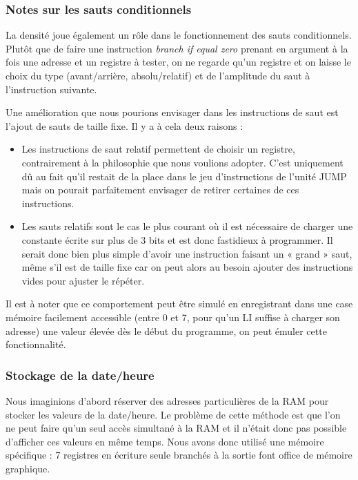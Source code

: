 \documentclass{article}
\begin{document}
\subsubsection{Notes sur les sauts conditionnels}
La densité joue également un rôle dans le fonctionnement des sauts conditionnels.
Plutôt que de faire une instruction \emph{branch if equal zero} prenant en argument
à la fois une adresse et un registre à tester, on ne regarde qu'un registre et on
laisse le choix du type (avant/arrière, absolu/relatif) et de l'amplitude du saut
à l'instruction suivante.

Une amélioration que nous pourions envisager dans les instructions de saut est
l'ajout de sauts de taille fixe. Il y a à cela deux raisons :
\begin{itemize}
  \item Les instructions de saut relatif permettent de choisir un registre, contrairement
        à la philosophie que nous voulions adopter. C'est uniquement dû au fait qu'il
        restait de la place dans le jeu d'instructions de l'unité JUMP mais on pourait
        parfaitement envisager de retirer certaines de ces instructions.
  \item Les sauts relatifs sont le cas le plus courant où il est nécessaire de charger
        une constante écrite sur plus de 3 bits et est donc fastidieux à programmer.
        Il serait donc bien plus simple d'avoir une instruction faisant un « grand »
        saut, même s'il est de taille fixe car on peut alors au besoin ajouter des
        instructions vides pour ajuster le répéter.
\end{itemize}

Il est à noter que ce comportement peut être simulé en enregistrant dans une case
mémoire facilement accessible (entre 0 et 7, pour qu'un LI suffise à charger son
adresse) une valeur élevée dès le début du programme, on peut émuler cette fonctionnalité.

\subsubsection{Stockage de la date/heure}
Nous imaginions d'abord réserver des adresses particulières de la RAM pour
stocker les valeurs de la date/heure. Le problème de cette méthode est que l'on
ne peut faire qu'un seul accès simultané à la RAM et il n'était donc pas possible
d'afficher ces valeurs en même temps. Nous avons donc utilisé une mémoire
spécifique : 7 registres en écriture seule branchés à la sortie font office
de mémoire graphique.
\end{document}
